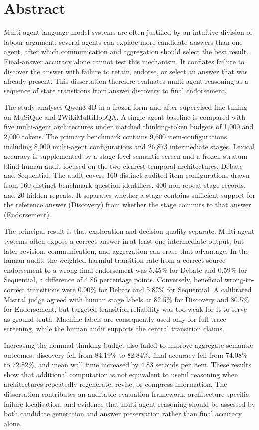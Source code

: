 \chapter*{Abstract}

Multi-agent language-model systems are often justified by an intuitive division-of-labour argument: several agents can explore more candidate answers than one agent, after which communication and aggregation should select the best result. Final-answer accuracy alone cannot test this mechanism. It conflates failure to discover the answer with failure to retain, endorse, or select an answer that was already present. This dissertation therefore evaluates multi-agent reasoning as a sequence of state transitions from answer discovery to final endorsement.

The study analyses Qwen3-4B in a frozen form and after supervised fine-tuning on MuSiQue and 2WikiMultiHopQA. A single-agent baseline is compared with five multi-agent architectures under matched thinking-token budgets of 1,000 and 2,000 tokens. The primary benchmark contains 9,600 item-configurations, including 8,000 multi-agent configurations and 26,873 intermediate stages. Lexical accuracy is supplemented by a stage-level semantic screen and a frozen-stratum blind human audit focused on the two clearest temporal architectures, Debate and Sequential. The audit covers 160 distinct audited item-configurations drawn from 160 distinct benchmark question identifiers, 400 non-repeat stage records, and 20 hidden repeats. It separates whether a stage contains sufficient support for the reference answer (Discovery) from whether the stage commits to that answer (Endorsement).

The principal result is that exploration and decision quality separate. Multi-agent systems often expose a correct answer in at least one intermediate output, but later revision, communication, and aggregation can erase that advantage. In the human audit, the weighted harmful transition rate from a correct source endorsement to a wrong final endorsement was 5.45\% for Debate and 0.59\% for Sequential, a difference of 4.86 percentage points. Conversely, beneficial wrong-to-correct transitions were 0.00\% for Debate and 5.82\% for Sequential. A calibrated Mistral judge agreed with human stage labels at 82.5\% for Discovery and 80.5\% for Endorsement, but targeted transition reliability was too weak for it to serve as ground truth. Machine labels are consequently used only for full-trace screening, while the human audit supports the central transition claims.

Increasing the nominal thinking budget also failed to improve aggregate semantic outcomes: discovery fell from 84.19\% to 82.84\%, final accuracy fell from 74.08\% to 72.82\%, and mean wall time increased by 4.83 seconds per item. These results show that additional computation is not equivalent to useful reasoning when architectures repeatedly regenerate, revise, or compress information. The dissertation contributes an auditable evaluation framework, architecture-specific failure localisation, and evidence that multi-agent reasoning should be assessed by both candidate generation and answer preservation rather than final accuracy alone.
